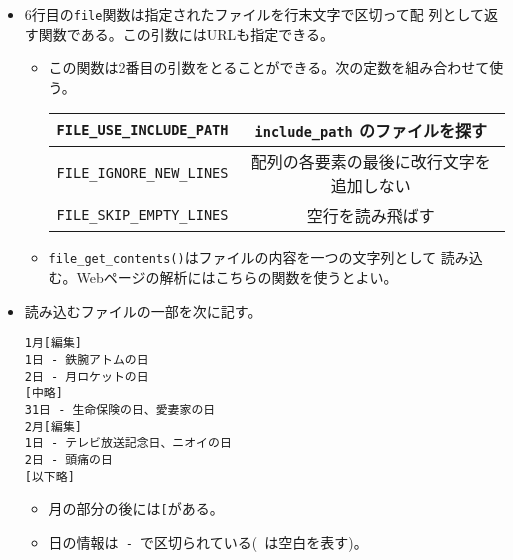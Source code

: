 \begin{Exec}
\begin{itemize}
       に設定している。
\begin{itemize}
 \item ここではコマンドプロンプトからもデバッグで
       きるように、スーパーグローバル\Verb+$_GET+内に値があれば
       (\Verb+isset()+)が\Verb+true+になれば、その値を、そうでなければコ
       マンドからの引数を設定している。
 \item コマンドから実行したときの引数はスーパーグローバル\Verb+$argv+に
       格納される。一番目は呼び出したファイル名であ
       り、その後に引数が順に入る\footnote{C言語の\texttt{main}関数は通
       常、\texttt{int main(int argc, char* argv[])}と宣言される。%
       \texttt{argc}は\texttt{argv}の配列の大きさを表し、渡された引数の
       リストが\texttt{argv[]}に入っている。このとき、\texttt{argv[0]}は実行
       したときのファイル名が入る。}。
\end{itemize}
 \item 6行目の\texttt{file}関数は指定されたファイルを行末文字で区切って配
       列として返す関数である。この引数にはURLも指定できる。
\begin{itemize}
 \item この関数は2番目の引数をとることができる。次の定数を組み合わせて使
       う。
\begin{center}
 \begin{tabular}{|c|c|}\hline
 \Verb+FILE_USE_INCLUDE_PATH+ & \Verb+include_path+ のファイルを探す\\\hline
 \Verb+FILE_IGNORE_NEW_LINES+ & 配列の各要素の最後に改行文字を追加しない
      \\ \hline
  \Verb+FILE_SKIP_EMPTY_LINES+&空行を読み飛ばす \\ \hline
 \end{tabular}
\end{center}
 \item \Verb+file_get_contents()+はファイルの内容を一つの文字列として
       読み込む。Webページの解析にはこちらの関数を使うとよい。
\end{itemize}
 \item 読み込むファイルの一部を次に記す。
\begin{Verbatim}
1月[編集]
1日 - 鉄腕アトムの日
2日 - 月ロケットの日
[中略]
31日 - 生命保険の日、愛妻家の日
2月[編集]
1日 - テレビ放送記念日、ニオイの日
2日 - 頭痛の日
[以下略]
\end{Verbatim}
\begin{itemize}
 \item 月の部分の後には\texttt{[}がある。
 \item 日の情報は\Verb*+ - +で区切られている(\Verb*+ +は空白を表す)。

\end{itemize}
\end{itemize}
\end{Exec}
